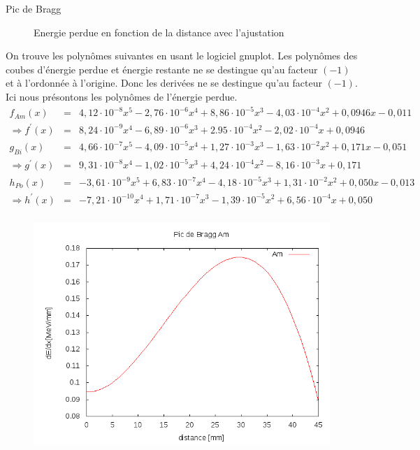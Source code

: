 \documentclass[a4paper,11pt,liststotocnumbered,bibtotocnumbered]{scrartcl}
\begin{document}
\begin{section}{Pic de Bragg}
\begin{figure}[hbt]
\begin{minipage}{0.45\textwidth}
\begin{center}
    \caption{Energie perdue en fonction de la distance avec l'ajustation}
    \end{center} 
   \end{minipage}
  \end{figure}
  On trouve les polynômes suivantes en usant le logiciel \flqq gnuplot\frqq. Les polynômes des coubes d'énergie perdue et énergie restante ne se destingue qu'au facteur $(-1)$ et à l'ordonnée à l'origine. Donc les derivées ne se destingue qu'au facteur $(-1)$. Ici nous présontons les polynômes de l'énergie perdue. 
  \begin{eqnarray*}
   f_{Am}(x)&=& 4,12\cdot10^{-8}x^5-2,76\cdot10^{-6}x^4+8,86\cdot10^{-5}x^3-4,03\cdot10^{-4}x^2+0,0946x-0,011\\
   \Rightarrow f^{\prime}(x)&=&8,24\cdot10^{-9}x^4-6,89\cdot10^{-6}x^3+2.95\cdot10^{-4}x^2-2,02\cdot10^{-4}x+0,0946\\
   g_{Bi}(x)&=& 4,66\cdot10^{-7}x^5-4,09\cdot10^{-5}x^4+1,27\cdot10^{-3}x^3-1,63\cdot10^{-2}x^2+0,171x-0,051\\ 
   \Rightarrow g^{\prime}(x)&=&9,31\cdot10^{-8}x^4-1,02\cdot10^{-5}x^3+4,24\cdot10^{-4}x^2-8,16\cdot10^{-3}x+0,171\\
   h_{Po}(x)&=& -3,61\cdot10^{-9}x^5+6,83\cdot10^{-7}x^4-4,18\cdot10^{-5}x^3+1,31\cdot10^{-2}x^2+0,050x-0,013\\
   \Rightarrow h^{\prime}(x)&=&-7,21\cdot10^{-10}x^4+1,71\cdot10^{-7}x^3-1,39\cdot10^{-5}x^2+6,56\cdot10^{-4}x+0,050\\
  \end{eqnarray*}
  \begin{figure}[H]
   \begin{minipage}{0.45\textwidth}
    \includegraphics[width=\textwidth]{Sabine/am_pic.png}

\end{minipage}
\end{figure}
\end{section}
\end{document}
